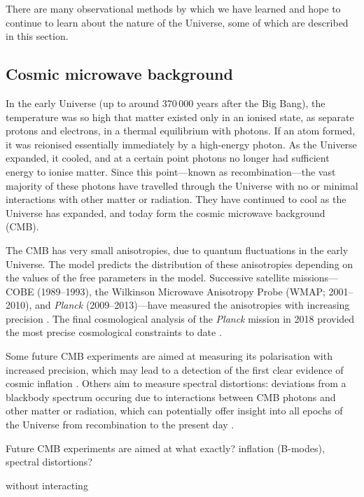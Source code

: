 \documentclass{scrbook}
\begin{document}
There are many observational methods by which we have learned and hope to continue to learn about the nature of the Universe, some of which are described in this section.

\subsection{Cosmic microwave background}
\label{Sec:cmb_intro}

In the early Universe (up to around 370\,000 years after the Big Bang), the temperature was so high that matter existed only in an ionised state, as separate protons and electrons, in a thermal equilibrium with photons. If an atom formed, it was reionised essentially immediately by a high-energy photon. As the Universe expanded, it cooled, and at a certain point photons no longer had sufficient energy to ionise matter. Since this point---known as recombination---the vast majority of these photons have travelled through the Universe with no or minimal interactions with other matter or radiation. They have continued to cool as the Universe has expanded, and today form the cosmic microwave background (CMB).

The CMB has very small anisotropies, due to quantum fluctuations in the early Universe. The \lcdm{} model predicts the distribution of these anisotropies depending on the values of the free parameters in the model. Successive satellite missions---COBE (1989--1993), the Wilkinson Microwave Anisotropy Probe (WMAP; 2001--2010), and \textit{Planck} (2009--2013)---have measured the anisotropies with increasing precision \citep{Bennett1996, Komatsu2011, Planck2015XIII}. The final cosmological analysis of the \textit{Planck} mission in 2018 provided the most precise cosmological constraints to date \citep{Planck2018VI}.

Some future CMB experiments are aimed at measuring its polarisation with increased precision, which may lead to a detection of the first clear evidence of cosmic inflation \citep{Kamionkowski2016}. Others aim to measure spectral distortions: deviations from a blackbody spectrum occuring due to interactions between CMB photons and other matter or radiation, which can potentially offer insight into all epochs of the Universe from recombination to the present day \citep{Chluba2021}.


Future CMB experiments are aimed at what exactly? inflation (B-modes), spectral distortions?

 without interacting
\end{document}
